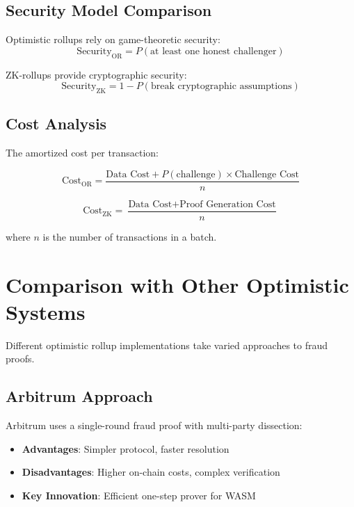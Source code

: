 \documentclass[11pt,a4paper]{article}
\theoremstyle{definition}
\begin{document}
\subsection{Security Model Comparison}

Optimistic rollups rely on game-theoretic security:
\begin{equation}
\text{Security}_{\text{OR}} = P(\text{at least one honest challenger})
\end{equation}

ZK-rollups provide cryptographic security:
\begin{equation}
\text{Security}_{\text{ZK}} = 1 - P(\text{break cryptographic assumptions})
\end{equation}

\subsection{Cost Analysis}

The amortized cost per transaction:

\begin{equation}
\text{Cost}_{\text{OR}} = \frac{\text{Data Cost} + P(\text{challenge}) \times \text{Challenge Cost}}{n}
\end{equation}

\begin{equation}
\text{Cost}_{\text{ZK}} = \frac{\text{Data Cost} + \text{Proof Generation Cost}}{n}
\end{equation}

where $n$ is the number of transactions in a batch.

\section{Comparison with Other Optimistic Systems}

Different optimistic rollup implementations take varied approaches to fraud proofs.

\subsection{Arbitrum Approach}

Arbitrum uses a single-round fraud proof with multi-party dissection:

\begin{itemize}
    \item \textbf{Advantages}: Simpler protocol, faster resolution
    \item \textbf{Disadvantages}: Higher on-chain costs, complex verification
    \item \textbf{Key Innovation}: Efficient one-step prover for WASM
\end{itemize}
\end{document}
